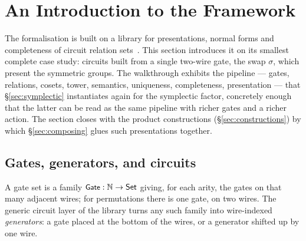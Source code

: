 \section{An Introduction to the Framework}\label{sec:permutations}

The formalisation is built on a library for presentations, normal forms
and completeness of circuit relation
sets~\cite{bian2026framework,qupit-code}.  This section introduces it on
its smallest complete case study: circuits built from a single two-wire
gate, the swap $\sigma$, which present the symmetric groups.  The
walkthrough exhibits the pipeline --- gates,
relations, cosets, tower, semantics, uniqueness, completeness,
presentation --- that \S\ref{sec:symplectic} instantiates again for the
symplectic factor, concretely enough that the latter can be read as the
same pipeline with richer gates and a richer action.  The section closes
with the product constructions (\S\ref{sec:constructions}) by which
\S\ref{sec:composing} glues such presentations together.

\subsection{Gates, generators, and circuits}\label{sec:sn-gates}

A gate set is a family $\mbox{\textsf{\small Gate}} : \mathbb{N} \to \mathsf{Set}$ giving,
for each arity, the gates on that many adjacent wires; for permutations
there is one gate, on two wires.  The generic circuit layer of the
library turns any such family into wire-indexed
\emph{generators}: a gate placed at the bottom of the wires, or a
generator shifted up by one wire.

